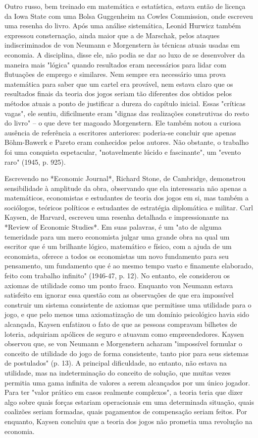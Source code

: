 \documentclass[12pt]{article}
\begin{document}
Outro russo, bem treinado em matemática e estatística, estava então de licença da Iowa State com uma Bolsa Guggenheim na Cowles Commission, onde escreveu uma resenha do livro. Após uma análise sistemática, Leonid Hurwicz também expressou consternação, ainda maior que a de Marschak, pelos ataques indiscriminados de von Neumann e Morgenstern às técnicas atuais usadas em economia. A disciplina, disse ele, não podia se dar ao luxo de se desenvolver da maneira mais "lógica" quando resultados eram necessários para lidar com flutuações de emprego e similares. Nem sempre era necessário uma prova matemática para saber que um cartel era provável, nem estava claro que os resultados finais da teoria dos jogos seriam tão diferentes dos obtidos pelos métodos atuais a ponto de justificar a dureza do capítulo inicial. Essas "críticas vagas", ele sentiu, dificilmente eram "dignas das realizações construtivas do resto do livro" – o que deve ter magoado Morgenstern. Ele também notou a curiosa ausência de referência a escritores anteriores: poderia-se concluir que apenas Böhm-Bawerk e Pareto eram conhecidos pelos autores. Não obstante, o trabalho foi uma conquista espetacular, "notavelmente lúcido e fascinante", um "evento raro" (1945, p. 925).

Escrevendo no *Economic Journal*, Richard Stone, de Cambridge, demonstrou sensibilidade à amplitude da obra, observando que ela interessaria não apenas a matemáticos, economistas e estudantes de teoria dos jogos em si, mas também a sociólogos, teóricos políticos e estudantes de estratégia diplomática e militar. Carl Kaysen, de Harvard, escreveu uma resenha detalhada e impressionante na *Review of Economic Studies*. Em suas palavras, é um "ato de alguma temeridade para um mero economista julgar uma grande obra na qual um escritor que é um brilhante lógico, matemático e físico, com a ajuda de um economista, oferece a todos os economistas um novo fundamento para seu pensamento, um fundamento que é ao mesmo tempo vasto e finamente elaborado, feito com trabalho infinito" (1946-47, p. 12). No entanto, ele considerou os axiomas de utilidade como um ponto fraco. Enquanto von Neumann estava satisfeito em ignorar essa questão com as observações de que era impossível construir um sistema consistente de axiomas que permitisse uma utilidade para o jogo, e que pelo menos uma axiomatização de um domínio psicológico havia sido alcançada, Kaysen enfatizou o fato de que as pessoas compravam bilhetes de loteria, adquiriam apólices de seguro e atuavam como empreendedores. Kaysen observou que, se von Neumann e Morgenstern acharam "impossível formular o conceito de utilidade do jogo de forma consistente, tanto pior para seus sistemas de postulados" (p. 13). A principal dificuldade, no entanto, não estava na utilidade, mas na indeterminação do conceito de solução, que muitas vezes permitia uma gama infinita de valores a serem alcançados por um único jogador. Para ter "valor prático em casos realmente complexos", a teoria teria que dizer algo sobre quais forças estariam operacionais em uma determinada situação, quais coalizões seriam formadas, quais pagamentos de compensação seriam feitos. Por enquanto, Kaysen concluiu que a teoria dos jogos não prometia uma revolução na economia.
\end{document}

